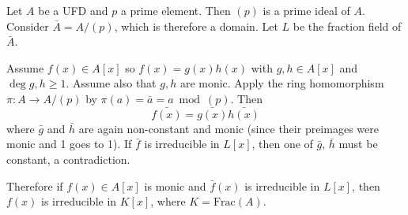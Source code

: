 \begin{remark}
Let $A$ be a UFD and $p$ a prime element. Then $(p)$ is a prime ideal
of $A$. Consider $\bar{A} = A / (p)$, which is therefore a domain.
Let $L$ be the fraction field of $\bar{A}$.

Assume $f(x) \in A[x]$ so $f(x) = g(x) h(x)$ with $g, h \in A[x]$ and
$\deg g, h \geq 1$. Assume also that $g, h$ are monic. Apply the ring
homomorphism
$\pi : A \to A / (p)$ by $\pi(a) = \bar{a} = a \bmod (p)$. Then
$$
\bar{f(x)} = \bar{g(x)}\bar{h(x)}
$$
where $\bar{g}$ and $\bar{h}$ are again non-constant and monic
(since their preimages were monic and 1 goes to 1). If
$\bar{f}$ is irreducible in $L[x]$, then one of $\bar{g}$,
$\bar{h}$ must be constant, a contradiction.

Therefore if $f(x) \in A[x]$ is monic and $\bar{f}(x)$ is irreducible
in $L[x]$, then $f(x)$ is irreducible in $K[x]$, where
$K = \mathrm{Frac}(A)$.
\end{remark}
